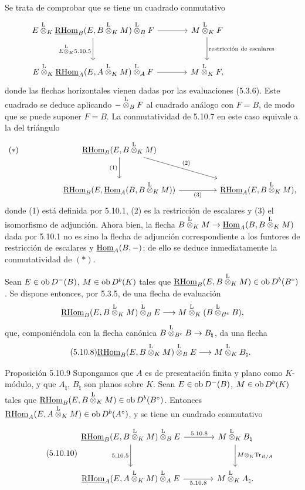 Se trata de comprobar que se tiene un cuadrado conmutativo
\[
\begin{tikzcd}[column sep=large,row sep=large]
E\lten_K\uRHom_B(E,B\lten_KM)\lten_BF \arrow[r] \arrow[d,"E\lten_K5.10.5"'] & M\lten_KF \arrow[d,"\text{restricción de escalares}"]\\
E\lten_K\uRHom_A(E,A\lten_KM)\lten_AF \arrow[r] & M\lten_KF,
\end{tikzcd}
\]
donde las flechas horizontales vienen dadas por las evaluaciones (5.3.6). Este cuadrado se deduce aplicando $-\overset{\mathrm L}{\otimes}_BF$ al cuadrado análogo con $F=B$, de modo que se puede suponer $F=B$. La conmutatividad de 5.10.7 en este caso equivale a la del triángulo
\[
\begin{tikzcd}[column sep=huge,row sep=large]
|[alias=star]| {(*)} & \uRHom_B(E,B\lten_KM) \arrow[d,"(1)"'] \arrow[dr,"(2)"] & \\
& \uRHom_B(E,\uHom_A(B,B\lten_KM)) \arrow[r,"(3)"'] & \uRHom_A(E,B\lten_KM),
\end{tikzcd}
\]
donde (1) está definida por 5.10.1, (2) es la restricción de escalares y (3) el isomorfismo de adjunción. Ahora bien, la flecha $B\overset{\mathrm L}{\otimes}_KM\to\underline{\operatorname{Hom}}_A(B,B\overset{\mathrm L}{\otimes}_KM)$ dada por 5.10.1 no es sino la flecha de adjunción correspondiente a los funtores de restricción de escalares y $\underline{\operatorname{Hom}}_A(B,-)$; de ello se deduce inmediatamente la conmutatividad de $(*)$.

Sean $E\in\operatorname{ob} D^-(B)$, $M\in\operatorname{ob} D^b(K)$ tales que $\underline{\mathrm{RHom}}_B(E,B\overset{\mathrm L}{\otimes}_KM)\in\operatorname{ob} D^b(B^\circ)$. Se dispone entonces, por 5.3.5, de una flecha de evaluación
\[
\underline{\mathrm{RHom}}_B(E,B\overset{\mathrm L}{\otimes}_KM)\overset{\mathrm L}{\otimes}_BE\longrightarrow M\overset{\mathrm L}{\otimes}_K(B\overset{\mathrm L}{\otimes}_{B^e}B),
\]
que, componiéndola con la flecha canónica $B\overset{\mathrm L}{\otimes}_{B^e}B\to B_\natural$, da una flecha
\begin{equation}\tag{5.10.8}
\underline{\mathrm{RHom}}_B(E,B\overset{\mathrm L}{\otimes}_KM)\overset{\mathrm L}{\otimes}_BE\longrightarrow M\overset{\mathrm L}{\otimes}_KB_\natural.
\end{equation}

\begin{statement}{Proposición 5.10.9}
Supongamos que $A$ es de presentación finita y plano como $K$-módulo, y que $A_\natural$, $B_\natural$ son planos sobre $K$. Sean $E\in\operatorname{ob} D^-(B)$, $M\in\operatorname{ob} D^b(K)$ tales que $\underline{\mathrm{RHom}}_B(E,B\overset{\mathrm L}{\otimes}_KM)\in\operatorname{ob} D^b(B^\circ)$. Entonces $\underline{\mathrm{RHom}}_A(E,A\overset{\mathrm L}{\otimes}_KM)\in\operatorname{ob} D^b(A^\circ)$, y se tiene un cuadrado conmutativo
\begin{equation}\tag{5.10.10}
\begin{tikzcd}[column sep=large,row sep=large]
\uRHom_B(E,B\lten_KM)\lten_BE \arrow[r,"5.10.8"] \arrow[d,"5.10.5"'] & M\lten_KB_\natural \arrow[d,"M\otimes_K\Tr_{B/A}"]\\
\uRHom_A(E,A\lten_KM)\lten_AE \arrow[r,"5.10.8"'] & M\lten_KA_\natural .
\end{tikzcd}
\end{equation}
\end{statement}

